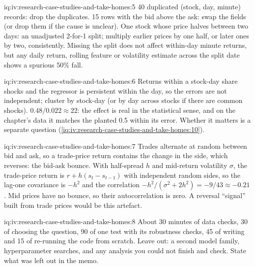 \begin{solution}{iq:iv:research-case-studies-and-take-homes:5}
40 duplicated (stock, day, minute) records: drop the duplicates. 15 rows with the bid above the ask: swap the fields (or drop
them if the cause is unclear). One stock whose price halves between two days: an unadjusted 2-for-1 split; multiply earlier
prices by one half, or later ones by two, consistently. Missing the split does not affect within-day minute returns, but any
daily return, rolling feature or volatility estimate across the split date shows a spurious 50\% fall.
\end{solution}

\begin{solution}{iq:iv:research-case-studies-and-take-homes:6}
Returns within a stock-day share shocks and the regressor is persistent within the day, so the errors are not independent;
cluster by stock-day (or by day across stocks if there are common shocks). $0.48/0.022 \approx 22$: the effect is real in the
statistical sense, and on the chapter's data it matches the planted 0.5 within its error. Whether it matters is a separate
question (\cref{iq:iv:research-case-studies-and-take-homes:10}).
\end{solution}

\begin{solution}{iq:iv:research-case-studies-and-take-homes:7}
Trades alternate at random between bid and ask, so a trade-price return contains the change in the side, which reverses: the
bid-ask bounce. With half-spread $h$ and mid-return volatility $\sigma$, the trade-price return is $r + h(s_{t} - s_{t-1})$
with independent random sides, so the lag-one covariance is $-h^2$ and the correlation $-h^2/(\sigma^2 + 2h^2) = -9/43 \approx
-0.21$. Mid prices have no bounce, so their autocorrelation is zero. A reversal ``signal'' built from trade prices would be
this artefact.
\end{solution}

\begin{solution}{iq:iv:research-case-studies-and-take-homes:8}
About 30 minutes of data checks, 30 of choosing the question, 90 of one test with its robustness checks, 45 of writing and 15
of re-running the code from scratch. Leave out: a second model family, hyperparameter searches, and any analysis you could not
finish and check. State what was left out in the memo.
\end{solution}

